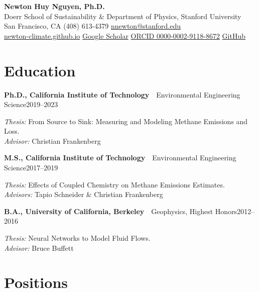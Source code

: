 \documentclass[11pt,letterpaper]{article}
\newcommand{\entry}[3]{\noindent\textbf{#1}~\textbar~#2\hfill{#3}\par}
\let\oldsection\section
\renewcommand{\section}[1]{\Needspace*{5\baselineskip}\oldsection{#1}}
\begin{document}
\begin{center}
  {\LARGE\bfseries Newton Huy Nguyen, Ph.D.}\\[4pt]
  Doerr School of Sustainability \& Department of Physics, Stanford University\\[3pt]
  San Francisco, CA \quad\textbullet\quad (408) 613-4379 \quad\textbullet\quad
  \href{mailto:nnewton@stanford.edu}{nnewton@stanford.edu}\\[2pt]
  \href{https://newton-climate.github.io}{newton-climate.github.io} \;\textbullet\;
  \href{https://scholar.google.com/citations?user=AziOzdwAAAAJ&hl=en}{Google Scholar} \;\textbullet\;
  \href{https://orcid.org/0000-0002-9118-8672}{ORCID 0000-0002-9118-8672} \;\textbullet\;
  \href{https://github.com/Newton-Climate}{GitHub}
\end{center}
\vspace{4pt}

\section{Education}

\entry{Ph.D., California Institute of Technology}{Environmental Engineering Science}{2019--2023}
\textit{Thesis:} From Source to Sink: Measuring and Modeling Methane Emissions and Loss.\\
\textit{Advisor:} Christian Frankenberg
\vspace{5pt}

\entry{M.S., California Institute of Technology}{Environmental Engineering Science}{2017--2019}
\textit{Thesis:} Effects of Coupled Chemistry on Methane Emissions Estimates.\\
\textit{Advisors:} Tapio Schneider \& Christian Frankenberg
\vspace{5pt}

\entry{B.A., University of California, Berkeley}{Geophysics, Highest Honors}{2012--2016}
\textit{Thesis:} Neural Networks to Model Fluid Flows.\\
\textit{Advisor:} Bruce Buffett

\section{Positions}
\end{document}
